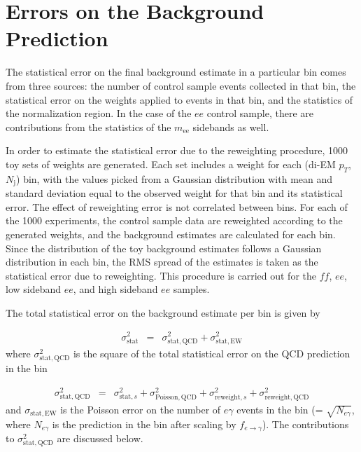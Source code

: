 \documentclass[dissertation.tex]{subfiles}
\begin{document}
\section{Errors on the Background Prediction}
\label{sec:Errors on the Background Prediction}

The statistical error on the final background estimate in a particular \MET bin comes from three sources: the number of control sample events collected in that bin, the statistical error on the weights applied to events in that bin, and the statistics of the normalization region.  In the case of the $ee$ control sample, there are contributions from the statistics of the $m_{\mathrm{ee}}$ sidebands as well.

In order to estimate the statistical error due to the reweighting procedure, 1000 toy sets of weights are generated.  Each set includes a weight for each (di-EM $p_{T}$, $N_{\mathrm{j}}$) bin, with the values picked from a Gaussian distribution with mean and standard deviation equal to the observed weight for that bin and its statistical error.  The effect of reweighting error is not correlated between \MET bins.  For each of the 1000 experiments, the control sample data are reweighted according to the generated weights, and the background estimates are calculated for each \MET bin.  Since the distribution of the toy background estimates follows a Gaussian distribution in each \MET bin, the RMS spread of the estimates is taken as the statistical error due to reweighting.  This procedure is carried out for the $\mathit{ff}$, $ee$, low sideband $ee$, and high sideband $ee$ samples.

The total statistical error on the background estimate per \MET bin is given by

\begin{eqnarray}
\sigma_{\mathrm{stat}}^{2} &=& \sigma_{\mathrm{stat,QCD}}^{2} + \sigma_{\mathrm{stat,EW}}^{2}
\label{eq:total_stat_error}
\end{eqnarray}
%
where $\sigma_{\mathrm{stat,QCD}}^{2}$ is the square of the total statistical error on the QCD prediction in the \MET bin

\begin{eqnarray}
\sigma_{\mathrm{stat,QCD}}^{2} &=& \sigma_{\mathrm{stat,}s}^{2} + \sigma_{\mathrm{Poisson,QCD}}^{2} + \sigma_{\mathrm{reweight,}s}^{2} + \sigma_{\mathrm{reweight,QCD}}^{2}
\label{eq:QCD_stat_error}
\end{eqnarray}
%
and $\sigma_{\mathrm{stat,EW}}$ is the Poisson error on the number of $e\gamma$ events in the \MET bin (= $\sqrt{N_{e\gamma}}$, where $N_{e\gamma}$ is the prediction in the \MET bin after scaling by $f_{e\rightarrow\gamma}$).  The contributions to $\sigma_{\mathrm{stat,QCD}}^{2}$ are discussed below.
\end{document}
